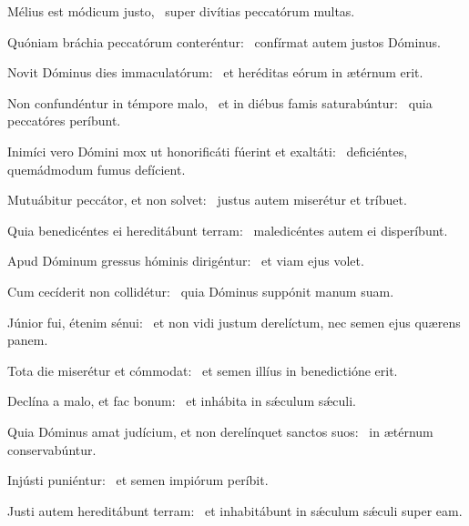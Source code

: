 
\item Mélius est módicum justo,~\psstar{} super divítias peccatórum multas.

\item Quóniam bráchia peccatórum conteréntur:~\psstar{} confírmat autem justos Dóminus.

\item Novit Dóminus dies immaculatórum:~\psstar{} et heréditas eórum in ætérnum erit.

\item Non confundéntur in témpore malo,~\pscross{} et in diébus famis saturabúntur:~\psstar{} quia peccatóres períbunt.

\item Inimíci vero Dómini mox ut honorificáti fúerint et exaltáti:~\psstar{} deficiéntes, quemádmodum fumus defícient.

\item Mutuábitur peccátor, et non solvet:~\psstar{} justus autem miserétur et tríbuet.

\item Quia benedicéntes ei hereditábunt terram:~\psstar{} maledicéntes autem ei disperíbunt.

\item Apud Dóminum gressus hóminis dirigéntur:~\psstar{} et viam ejus volet.

\item Cum cecíderit non collidétur:~\psstar{} quia Dóminus suppónit manum suam.

\item Júnior fui, étenim sénui:~\psstar{} et non vidi justum derelíctum, nec semen ejus quærens panem.

\item Tota die miserétur et cómmodat:~\psstar{} et semen illíus in benedictióne erit.

\item Declína a malo, et fac bonum:~\psstar{} et inhábita in sǽculum sǽculi.

\item Quia Dóminus amat judícium, et non derelínquet sanctos suos:~\psstar{} in ætérnum conservabúntur.

\item Injústi puniéntur:~\psstar{} et semen impiórum períbit.

\item Justi autem hereditábunt terram:~\psstar{} et inhabitábunt in sǽculum sǽculi super eam.
